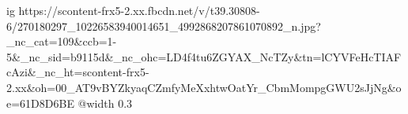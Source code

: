  
 
 
 
 

\ifcmt
  ig https://scontent-frx5-2.xx.fbcdn.net/v/t39.30808-6/270180297_10226583940014651_4992868207861070892_n.jpg?_nc_cat=109&ccb=1-5&_nc_sid=b9115d&_nc_ohc=LD4f4tu6ZGYAX_NcTZy&tn=lCYVFeHcTIAFcAzi&_nc_ht=scontent-frx5-2.xx&oh=00_AT9vBYZkyaqCZmfyMeXxhtwOatYr_CbmMompgGWU2sJjNg&oe=61D8D6BE
  @width 0.3
\fi
